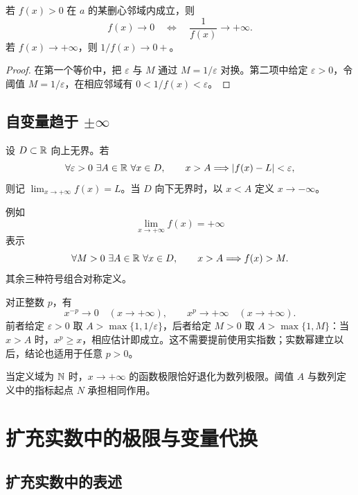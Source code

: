 \begin{proposition}[倒数联系]
若 \(f(x)>0\) 在 \(a\) 的某删心邻域内成立，则
\[
 f(x)\to0
 \quad\Longleftrightarrow\quad
 \frac1{f(x)}\to+\infty.
\]
若 \(f(x)\to+\infty\)，则 \(1/f(x)\to0+\)。
\end{proposition}

\begin{proof}
在第一个等价中，把 \(\varepsilon\) 与 \(M\) 通过 \(M=1/\varepsilon\) 对换。第二项中给定 \(\varepsilon>0\)，令阈值 \(M=1/\varepsilon\)，在相应邻域有 \(0<1/f(x)<\varepsilon\)。
\end{proof}

\subsection{自变量趋于 \texorpdfstring{\(\pm\infty\)}{infinity}}

\begin{definition}[无穷远处的有限极限]
设 \(D\subset\mathbb{R}\) 向上无界。若
\[
 \forall\varepsilon>0\ \exists A\in\mathbb{R}\ \forall x\in D,\qquad
 x>A\Longrightarrow\left|f(x)-L\right|<\varepsilon,
\]
则记 \(\lim_{x\to+\infty}f(x)=L\)。当 \(D\) 向下无界时，以 \(x<A\) 定义 \(x\to-\infty\)。
\end{definition}

\begin{definition}[无穷远处的无穷极限]
例如
\[
 \lim_{x\to+\infty}f(x)=+\infty
\]
表示
\[
 \forall M>0\ \exists A\in\R\ \forall x\in D,\qquad
 x>A\Longrightarrow f(x)>M.
\]
其余三种符号组合对称定义。
\end{definition}

\begin{example}
对正整数 \(p\)，有
\[
 x^{-p}\to0\quad(x\to+\infty),\qquad
 x^p\to+\infty\quad(x\to+\infty).
\]
前者给定 \(\varepsilon>0\) 取 \(A>\max\{1,1/\varepsilon\}\)，后者给定 \(M>0\) 取 \(A>\max\{1,M\}\)：当 \(x>A\) 时，\(x^p\ge x\)，相应估计即成立。这不需要提前使用实指数；实数幂建立以后，结论也适用于任意 \(p>0\)。
\end{example}

当定义域为 \(\mathbb{N}\) 时，\(x\to+\infty\) 的函数极限恰好退化为数列极限。阈值 \(A\) 与数列定义中的指标起点 \(N\) 承担相同作用。

\section{扩充实数中的极限与变量代换}

\subsection{扩充实数中的表述}


